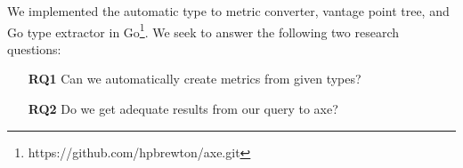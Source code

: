 We implemented the automatic type to metric converter,
vantage point tree,
and Go type extractor in Go\cite{githubRepo}\footnote{https://github.com/hpbrewton/axe.git}.
We seek to answer the following two research questions:
\begin{itemize}
    \item[\textbf{RQ1}] Can we automatically create metrics from given types?
    \item[\textbf{RQ2}] Do we get adequate results from our query to axe?
\end{itemize}